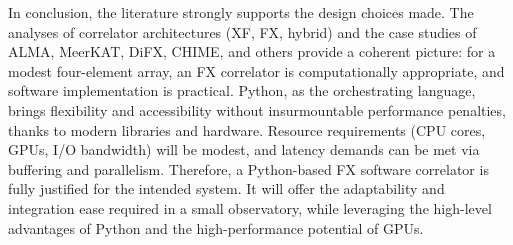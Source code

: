 In conclusion, the literature strongly supports the design choices made. The analyses of correlator architectures (XF, FX, hybrid) and the case studies of ALMA, MeerKAT, DiFX, CHIME, and others provide a coherent picture: for a modest four-element array, an FX correlator is computationally appropriate, and software implementation is practical. Python, as the orchestrating language, brings flexibility and accessibility without insurmountable performance penalties, thanks to modern libraries and hardware. Resource requirements (CPU cores, GPUs, I/O bandwidth) will be modest, and latency demands can be met via buffering and parallelism. Therefore, a Python-based FX software correlator is fully justified for the intended system. It will offer the adaptability and integration ease required in a small observatory, while leveraging the high-level advantages of Python and the high-performance potential of GPUs.